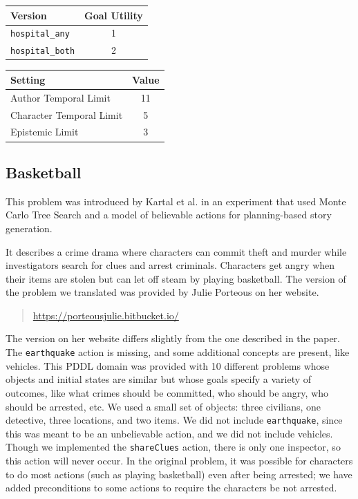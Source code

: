 \documentclass{nilreport}
\makeatletter
\renewcommand{\bibentry}[1]{\nocite{#1}{\frenchspacing\@nameuse{BR@r@#1\@extra@b@citeb}}}
\makeatother
\begin{document}
\medskip{}

\begin{center}
\begin{tabular}[t]{|l|c|}
\hline 
\textbf{Version} & \textbf{Goal Utility}\tabularnewline
\hline 
\hline 
\texttt{hospital\_any} & 1\tabularnewline
\hline 
\texttt{hospital\_both} & 2\tabularnewline
\hline 
\end{tabular}\textbf{\quad{}}%
\begin{tabular}[t]{|l|c|}
\hline 
\textbf{Setting} & \textbf{Value}\tabularnewline
\hline 
\hline 
Author Temporal Limit & 11\tabularnewline
\hline 
Character Temporal Limit & 5\tabularnewline
\hline 
Epistemic Limit & 3\tabularnewline
\hline 
\end{tabular}
\par\end{center}

\subsection{Basketball}

This problem was introduced by Kartal et al. in an experiment that
used Monte Carlo Tree Search and a model of believable actions for
planning-based story generation.

\begin{quote}
	\bibentry{kartal2014user}
\end{quote}

\noindent It describes a crime drama where characters can commit theft
and murder while investigators search for clues and arrest criminals.
Characters get angry when their items are stolen but can let off steam
by playing basketball. The version of the problem we translated was
provided by Julie Porteous on her website.

\begin{quote}
	\url{https://porteousjulie.bitbucket.io/}
\end{quote}

\noindent The version on her website differs slightly from the one
described in the paper. The \texttt{earthquake} action is missing,
and some additional concepts are present, like vehicles. This PDDL
domain was provided with 10 different problems whose objects and initial
states are similar but whose goals specify a variety of outcomes,
like what crimes should be committed, who should be angry, who should
be arrested, etc. We used a small set of objects: three civilians,
one detective, three locations, and two items. We did not include
\texttt{earthquake}, since this was meant to be an unbelievable action,
and we did not include vehicles. Though we implemented the \texttt{shareClues}
action, there is only one inspector, so this action will never occur.
In the original problem, it was possible for characters to do most actions
(such as playing basketball) even after being arrested; we have added
preconditions to some actions to require the characters be not arrested.
\end{document}
